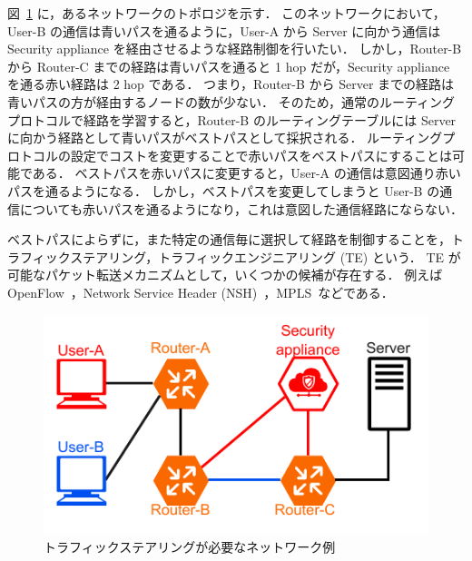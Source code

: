 図~\ref*{fig:exp-src-rtng} に，あるネットワークのトポロジを示す．
このネットワークにおいて，User-B の通信は青いパスを通るように，User-A から Server に向かう通信は Security appliance を経由させるような経路制御を行いたい．
しかし，Router-B から Router-C までの経路は青いパスを通ると 1 hop だが，Security appliance を通る赤い経路は 2 hop である．
つまり，Router-B から Server までの経路は青いパスの方が経由するノードの数が少ない．
そのため，通常のルーティングプロトコルで経路を学習すると，Router-B のルーティングテーブルには Server に向かう経路として青いパスがベストパスとして採択される．
ルーティングプロトコルの設定でコストを変更することで赤いパスをベストパスにすることは可能である．
ベストパスを赤いパスに変更すると，User-A の通信は意図通り赤いパスを通るようになる．
しかし，ベストパスを変更してしまうと User-B の通信についても赤いパスを通るようになり，これは意図した通信経路にならない．

ベストパスによらずに，また特定の通信毎に選択して経路を制御することを，トラフィックステアリング，トラフィックエンジニアリング (TE) という．
TE が可能なパケット転送メカニズムとして，いくつかの候補が存在する．
例えば OpenFlow~\cite{openflow}，Network Service Header (NSH)~\cite{rfc8300}，MPLS~\cite{rfc3031}などである．

\begin{figure}[t]
    \centering
    \includegraphics[width=0.95\linewidth]{img/ExplainSrcRtng.pdf}
    \caption{トラフィックステアリングが必要なネットワーク例}
    \label{fig:exp-src-rtng}
\end{figure}

